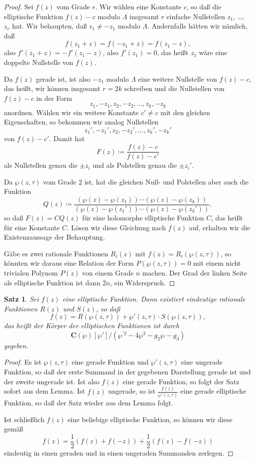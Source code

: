 \documentclass[a4paper,twoside,openright]{report}
\newtheorem{thm}{Satz}[chapter]
\theoremstyle{definition}
\theoremstyle{remark}
\begin{document}
\begin{proof}
  Sei $f(z)$ vom Grade $r$.
  Wir wählen eine Konstante $c$, so daß die elliptische Funktion $f(z) - c$
  modulo $\Lambda$ insgesamt $r$ einfache Nullstellen $z_1$, \dots, $z_r$
  hat. Wir behaupten, daß $z_1 \neq - z_1$ modulo $\Lambda$. Andernfalls
  hätten wir nämlich, daß
  \[
    f(z_1 + z) = f(-z_1 + z) = f(z_1 - z),
  \]
  also $f'(z_1 + z) = - f'(z_1 - z)$, also $f'(z_1) = 0$, das heißt $z_1$ wäre
  eine doppelte Nullstelle von $f(z)$.
  
  Da $f(z)$ gerade ist, ist also $-z_1$ modulo $\Lambda$ eine weitere Nullstelle
  von $f(z) - c$, das heißt, wir können insgesamt $r = 2 k$ schreiben und die
  Nullstellen von $f(z) - c$ in der Form
  \[
    z_1, -z_1, z_2, -z_2, \dotsc, z_k, -z_k
  \]
  anordnen. Wählen wir ein weitere Konstante $c' \neq c$ mit den gleichen
  Eigenschaften, so bekommen wir analog Nullstellen
  \[
    z_1', -z_1', z_2, -z_2', \dotsc, z_k', -z_k'
  \]
  von $f(z) - c'$.
  Damit hat
  \[
    F(z) \coloneqq \frac{f(z) - c}{f(z) - c'}
  \]
  als Nullstellen genau die $\pm z_i$ und als Polstellen genau die $\pm z_i'$.
  
  Da $\wp(z, \tau)$ vom Grade $2$ ist, hat die gleichen Null- und Polstellen aber auch die Funktion
  \[
    Q(z) \coloneqq \frac{(\wp(z) - \wp(z_1)) \dotsm (\wp(z) - \wp(z_k))}{(\wp(z) - \wp(z_1')) \dotsm (\wp(z) - \wp(z_k'))},
  \]
  so daß $F(z) = C Q(z)$ für eine holomorphe elliptische Funktion $C$, das 
  heißt für eine Konstante $C$. Lösen wir diese Gleichung nach $f(z)$ auf,
  erhalten wir die Existenzaussage der Behauptung.
  
  Gäbe es zwei rationale Funktionen $R_i(z)$ mit $f(z) = R_i(\wp(z, \tau))$,
  so könnten wir daraus eine Relation der Form $P(\wp(z, \tau)) = 0$ mit einem
  nicht trivialen Polynom $P(z)$ von einem Grade $n$ machen. Der Grad der linken
  Seite als elliptische Funktion ist dann $2n$, ein Widerspruch.
\end{proof}

\begin{thm}
  Sei $f(z)$ eine elliptische Funktion. Dann existiert eindeutige rationale
  Funktionen $R(z)$ und $S(z)$, so daß
  \[
    f(z) = R(\wp(z, \tau)) + \wp'(z, \tau) \cdot S(\wp(z, \tau)),
  \]
  das heißt der Körper der elliptischen Funktionen ist durch
  \[
    \mathbf C(\wp)[\wp']/(\wp^{\prime 2} - 4 \wp^3 - g_2 \wp - g_3)
  \]
  gegeben. 
\end{thm}

\begin{proof}
  Es ist $\wp(z, \tau)$ eine gerade Funktion und $\wp'(z, \tau)$ eine ungerade Funktion, so daß der erste Summand in 
  der gegebenen Darstellung gerade ist und der zweite ungerade ist. Ist also
  $f(z)$ eine gerade Funktion, so folgt der Satz sofort aus dem Lemma.
  Ist $f(z)$ ungerade, so ist $\frac{f(z)}{\wp'(z, \tau)}$ eine gerade elliptische
  Funktion, so daß der Satz wieder aus dem Lemma folgt.
  
  Ist schließlich $f(z)$ eine beliebige elliptische Funktion, so können wir diese
  gemäß
  \[
    f(z) = \frac 1 2 (f(z) + f(-z)) + \frac 1 2 (f(z) - f(-z))
  \]
  eindeutig in einen geraden und in einen ungeraden Summanden zerlegen.
\end{proof}
\end{document}
